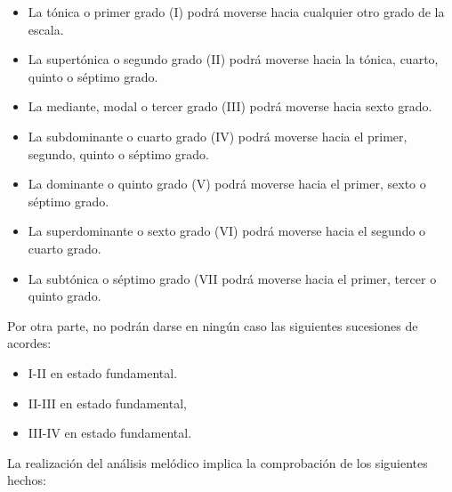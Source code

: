 \begin{itemize}
\begin{itemize}
			\item La tónica o primer grado (I) podrá moverse hacia cualquier otro grado de la escala.
			\item La supertónica o segundo grado (II) podrá moverse hacia la tónica, cuarto, quinto o séptimo grado.
			\item La mediante, modal o tercer grado (III) podrá moverse hacia sexto grado.
			\item La subdominante o cuarto grado (IV) podrá moverse hacia el primer, segundo, quinto o séptimo grado.
			\item La dominante o quinto grado (V) podrá moverse hacia el primer, sexto o séptimo grado.
			\item La superdominante o sexto grado (VI) podrá moverse hacia el segundo o cuarto grado.
			\item La subtónica o séptimo grado (VII podrá moverse hacia el primer, tercer o quinto grado.
		\end{itemize}

		Por otra parte, no podrán darse en ningún caso las siguientes sucesiones de acordes:

		\begin{itemize}
			\item I-II en estado fundamental.
			\item II-III en estado fundamental,
			\item III-IV en estado fundamental.
		\end{itemize}

\end{itemize}

La realización del análisis melódico implica la comprobación de los siguientes hechos:

